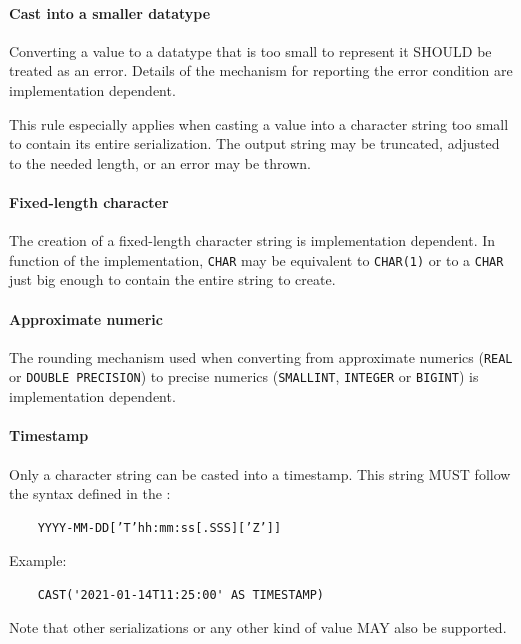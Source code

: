 \documentclass[11pt,a4paper]{ivoa}
\begin{document}
\paragraph{Cast into a smaller datatype}

Converting a value to a datatype that is too small to represent it SHOULD be
treated as an error. Details of the mechanism for reporting the error condition
are implementation dependent.

This rule especially applies when casting a value into a character string too
small to contain its entire serialization. The output string may be truncated,
adjusted to the needed length, or an error may be thrown.

\paragraph{Fixed-length character}

The creation of a fixed-length character string is implementation dependent.
In function of the implementation, \verb:CHAR: may be equivalent to
\verb:CHAR(1): or to a \verb:CHAR: just big enough to contain the entire string
to create.

\paragraph{Approximate numeric}

The rounding mechanism used when converting from approximate numerics
(\verb:REAL: or \verb:DOUBLE PRECISION:) to precise numerics (\verb:SMALLINT:,
\verb:INTEGER: or \verb:BIGINT:) is implementation dependent.

\paragraph{Timestamp}

Only a character string can be casted into a timestamp. This string MUST follow
the syntax defined in the \DALISpec{}:
\begin{verbatim}
    YYYY-MM-DD[’T’hh:mm:ss[.SSS][’Z’]]
\end{verbatim}

Example:

\begin{verbatim}
    CAST('2021-01-14T11:25:00' AS TIMESTAMP)
\end{verbatim}

Note that other serializations or any other kind of value MAY also be supported.
\end{document}
